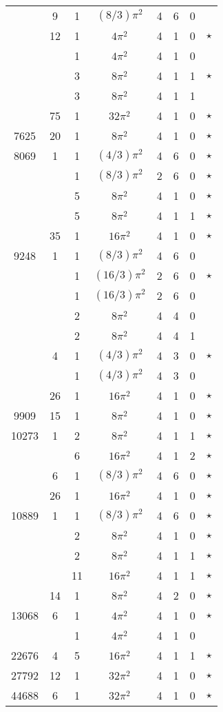 \documentclass[12pt]{amsart}
\begin{document}
\begin{tabular}{ccc|ccccc}
 & 9 & 1 & $(8/3)\pi^2$ & 4 & 6 & 0 &  \\
 & 12 & 1 & $4\pi^2$ & 4 & 1 & 0 & $\star$ \\
 &  & 1 & $4\pi^2$ & 4 & 1 & 0 &  \\
 &  & 3 & $8\pi^2$ & 4 & 1 & 1 & $\star$ \\
 &  & 3 & $8\pi^2$ & 4 & 1 & 1 &  \\
 & 75 & 1 & $32\pi^2$ & 4 & 1 & 0 & $\star$ \\
7625 & 20 & 1 & $8\pi^2$ & 4 & 1 & 0 & $\star$ \\
8069 & 1 & 1 & $(4/3)\pi^2$ & 4 & 6 & 0 & $\star$ \\
 &  & 1 & $(8/3)\pi^2$ & 2 & 6 & 0 & $\star$ \\
 &  & 5 & $8\pi^2$ & 4 & 1 & 0 & $\star$ \\
 &  & 5 & $8\pi^2$ & 4 & 1 & 1 & $\star$ \\
 & 35 & 1 & $16\pi^2$ & 4 & 1 & 0 & $\star$ \\
9248 & 1 & 1 & $(8/3)\pi^2$ & 4 & 6 & 0 &  \\
 &  & 1 & $(16/3)\pi^2$ & 2 & 6 & 0 & $\star$ \\
 &  & 1 & $(16/3)\pi^2$ & 2 & 6 & 0 &  \\
 &  & 2 & $8\pi^2$ & 4 & 4 & 0 &  \\
 &  & 2 & $8\pi^2$ & 4 & 4 & 1 &  \\
 & 4 & 1 & $(4/3)\pi^2$ & 4 & 3 & 0 & $\star$ \\
 &  & 1 & $(4/3)\pi^2$ & 4 & 3 & 0 &  \\
 & 26 & 1 & $16\pi^2$ & 4 & 1 & 0 & $\star$ \\
9909 & 15 & 1 & $8\pi^2$ & 4 & 1 & 0 & $\star$ \\
10273 & 1 & 2 & $8\pi^2$ & 4 & 1 & 1 & $\star$ \\
 &  & 6 & $16\pi^2$ & 4 & 1 & 2 & $\star$ \\
 & 6 & 1 & $(8/3)\pi^2$ & 4 & 6 & 0 & $\star$ \\
 & 26 & 1 & $16\pi^2$ & 4 & 1 & 0 & $\star$ \\
10889 & 1 & 1 & $(8/3)\pi^2$ & 4 & 6 & 0 & $\star$ \\
 &  & 2 & $8\pi^2$ & 4 & 1 & 0 & $\star$ \\
 &  & 2 & $8\pi^2$ & 4 & 1 & 1 & $\star$ \\
 &  & 11 & $16\pi^2$ & 4 & 1 & 1 & $\star$ \\
 & 14 & 1 & $8\pi^2$ & 4 & 2 & 0 & $\star$ \\
13068 & 6 & 1 & $4\pi^2$ & 4 & 1 & 0 & $\star$ \\
 &  & 1 & $4\pi^2$ & 4 & 1 & 0 &  \\
22676 & 4 & 5 & $16\pi^2$ & 4 & 1 & 1 & $\star$ \\
27792 & 12 & 1 & $32\pi^2$ & 4 & 1 & 0 & $\star$ \\
44688 & 6 & 1 & $32\pi^2$ & 4 & 1 & 0 & $\star$ \\
\end{tabular}
\end{document}
